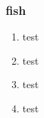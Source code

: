 \begin{frame}
  \frametitle{fish}
	 \begin{enumerate}
	    \item test
	    \item test
	    \item test
	    \item test
	  \end{enumerate}
\end{frame}